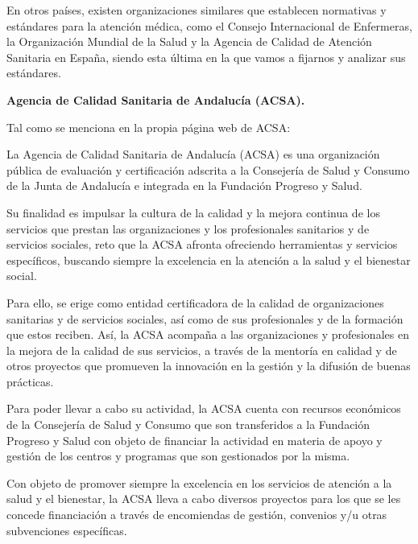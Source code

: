     \vskip 0.1in

    En otros países, existen organizaciones similares que establecen normativas y estándares para la atención médica, como el Consejo Internacional de Enfermeras, la Organización Mundial de la Salud y la Agencia de Calidad de Atención Sanitaria en España, siendo esta última en la que vamos a fijarnos y analizar sus estándares.

    \newpage
    \vskip 0.2in
    {\large \textbf{Agencia de Calidad Sanitaria de Andalucía (ACSA).}}
    \vskip 0.2in

        Tal como se menciona en la propia página web de ACSA\cite{ACSA_Quienes_Son}: 
        \vskip 0.15in

        La Agencia de Calidad Sanitaria de Andalucía (ACSA) es una organización pública de evaluación y certificación adscrita a la Consejería de Salud y Consumo de la Junta de Andalucía e integrada en la Fundación Progreso y Salud\cite{ACSA_Quienes_Son}. 

        \vskip 0.1in
        
        Su finalidad es impulsar la cultura de la calidad y la mejora continua de los servicios que prestan las organizaciones y los profesionales sanitarios y de servicios sociales, reto que la ACSA afronta ofreciendo herramientas y servicios específicos, buscando siempre la excelencia en la atención a la salud y el bienestar social\cite{ACSA_Quienes_Son}.

        \vskip 0.1in

        Para ello, se erige como entidad certificadora de la calidad de organizaciones sanitarias y de servicios sociales, así como de sus profesionales y de la formación que estos reciben. Así, la ACSA acompaña a las organizaciones y profesionales en la mejora de la calidad de sus servicios, a través de la mentoría en calidad y de otros proyectos que promueven la innovación en la gestión y la difusión de buenas prácticas\cite{ACSA_Quienes_Son}.

        \vskip 0.1in
        
        Para poder llevar a cabo su actividad, la ACSA cuenta con recursos económicos de la Consejería de Salud y Consumo que son transferidos a la Fundación Progreso y Salud con objeto de financiar la actividad en materia de apoyo y gestión de los centros y programas que son gestionados por la misma\cite{ACSA_Quienes_Son}. 

        \vskip 0.1in
        
        Con objeto de promover siempre la excelencia en los servicios de atención a la salud y el bienestar, la ACSA lleva a cabo diversos proyectos para los que se les concede financiación a través de encomiendas de gestión, convenios y/u otras subvenciones específicas\cite{ACSA_Quienes_Son}. 

